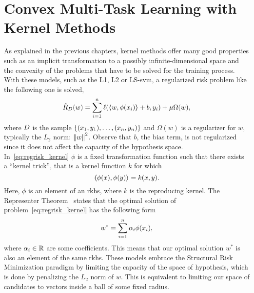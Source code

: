 \section{Convex Multi-Task Learning with Kernel Methods}
\label{sec:convexmlt_kernel}


As explained in the previous chapters, kernel methods offer many good properties such as an implicit transformation to a possibly infinite-dimensional space and the convexity of the problems that have to be solved for the training process. With these models, such as the L1, L2 or LS-\acrshort{svm}, a regularized risk problem like the following one is solved,
\begin{equation}
    \label{eq:regrisk_kernel}
    \emprisk({w}) = \sum_{i=1}^{\nsamples} \lossf(\dotp{w}{\phi({x}_i)} + b, y_i) + \mu \Omega({w}) ,
\end{equation}
where $D$ is the sample $\{(x_1, y_1), \ldots, (x_n, y_n)\}$ and $\Omega(w)$ is a regularizer for ${w}$, typically the $L_2$ norm: $\left\lVert w\right\rVert^2$. Observe that $b$, the bias term, is not regularized since it does not affect the capacity of the hypothesis space.
In~\eqref{eq:regrisk_kernel} $\phi$ is a fixed transformation function such that there exists a ``kernel trick'', that is a kernel function $k$ for which
\begin{equation}
    \nonumber
    \bm{\left\langle} \phi(x), \phi(y) \bm{\right\rangle} = k(x, y).
\end{equation}
Here, $\phi$ is an element of an \acrshort{rkhs}, where $k$ is the reproducing kernel. 
The Representer Theorem~\citep*{ScholkopfHS01} states that the optimal solution of problem~\eqref{eq:regrisk_kernel} has the following form
\begin{equation}
    \nonumber
    w^* = \sum_{i=1}^n \alpha_i \phi(x_i) ,
\end{equation}
where $\alpha_i \in \mathbb{R}$ are some coefficients. This means that our optimal solution $w^*$ is also an element of the same \acrshort{rkhs}.
These models embrace the Structural Risk Minimization paradigm by limiting the capacity of the space of hypothesis, which is done by penalizing the $L_2$ norm of $w$. This is equivalent to limiting our space of candidates to vectors inside a ball of some fixed radius.

